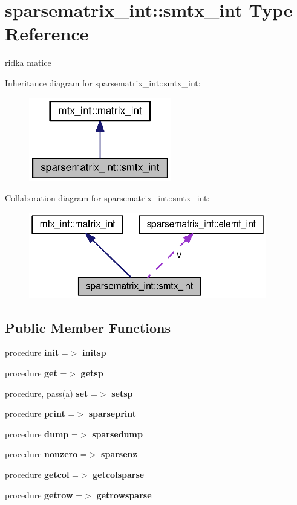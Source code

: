 \section{sparsematrix\+\_\+int\+:\+:smtx\+\_\+int Type Reference}
\label{structsparsematrix__int_1_1smtx__int}


ridka matice  




Inheritance diagram for sparsematrix\+\_\+int\+:\+:smtx\+\_\+int\+:\nopagebreak
\begin{figure}[H]
\begin{center}
\leavevmode
\includegraphics[width=176pt]{structsparsematrix__int_1_1smtx__int__inherit__graph}
\end{center}
\end{figure}


Collaboration diagram for sparsematrix\+\_\+int\+:\+:smtx\+\_\+int\+:\nopagebreak
\begin{figure}[H]
\begin{center}
\leavevmode
\includegraphics[width=294pt]{structsparsematrix__int_1_1smtx__int__coll__graph}
\end{center}
\end{figure}
\subsection*{Public Member Functions}
\begin{DoxyCompactItemize}
\item 
procedure {\bf init} =$>$ {\bf initsp}
\item 
procedure {\bf get} =$>$ {\bf getsp}
\item 
procedure, pass(a) {\bf set} =$>$ {\bf setsp}
\item 
procedure {\bf print} =$>$ {\bf sparseprint}
\item 
procedure {\bf dump} =$>$ {\bf sparsedump}
\item 
procedure {\bf nonzero} =$>$ {\bf sparsenz}
\item 
procedure {\bf getcol} =$>$ {\bf getcolsparse}
\item 
procedure {\bf getrow} =$>$ {\bf getrowsparse}
\end{DoxyCompactItemize}
